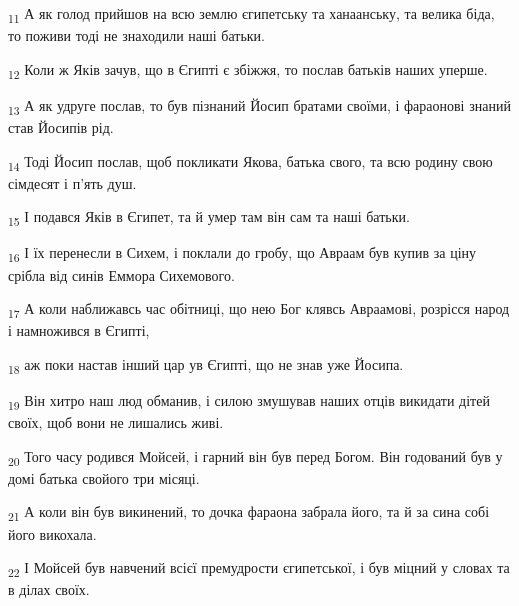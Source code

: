 \begin{tcolorbox}
\textsubscript{11} А як голод прийшов на всю землю єгипетську та ханаанську, та велика біда, то поживи тоді не знаходили наші батьки.
\end{tcolorbox}
\begin{tcolorbox}
\textsubscript{12} Коли ж Яків зачув, що в Єгипті є збіжжя, то послав батьків наших уперше.
\end{tcolorbox}
\begin{tcolorbox}
\textsubscript{13} А як удруге послав, то був пізнаний Йосип братами своїми, і фараонові знаний став Йосипів рід.
\end{tcolorbox}
\begin{tcolorbox}
\textsubscript{14} Тоді Йосип послав, щоб покликати Якова, батька свого, та всю родину свою сімдесят і п'ять душ.
\end{tcolorbox}
\begin{tcolorbox}
\textsubscript{15} І подався Яків в Єгипет, та й умер там він сам та наші батьки.
\end{tcolorbox}
\begin{tcolorbox}
\textsubscript{16} І їх перенесли в Сихем, і поклали до гробу, що Авраам був купив за ціну срібла від синів Еммора Сихемового.
\end{tcolorbox}
\begin{tcolorbox}
\textsubscript{17} А коли наближавсь час обітниці, що нею Бог клявсь Авраамові, розрісся народ і намножився в Єгипті,
\end{tcolorbox}
\begin{tcolorbox}
\textsubscript{18} аж поки настав інший цар ув Єгипті, що не знав уже Йосипа.
\end{tcolorbox}
\begin{tcolorbox}
\textsubscript{19} Він хитро наш люд обманив, і силою змушував наших отців викидати дітей своїх, щоб вони не лишались живі.
\end{tcolorbox}
\begin{tcolorbox}
\textsubscript{20} Того часу родився Мойсей, і гарний він був перед Богом. Він годований був у домі батька свойого три місяці.
\end{tcolorbox}
\begin{tcolorbox}
\textsubscript{21} А коли він був викинений, то дочка фараона забрала його, та й за сина собі його викохала.
\end{tcolorbox}
\begin{tcolorbox}
\textsubscript{22} І Мойсей був навчений всієї премудрости єгипетської, і був міцний у словах та в ділах своїх.
\end{tcolorbox}
